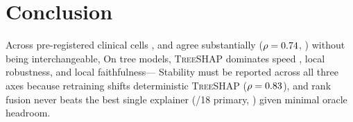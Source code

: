 \section{Conclusion}\label{sec:conclusion}

Across \NumCells{} pre-registered clinical cells ,
\shap{} and \lime{} agree substantially ($\rho=0.74{}$,
) without being interchangeable,  On tree models,
\textsc{TreeSHAP} dominates speed ,
local robustness, and local faithfulness--- Stability must be reported across all three axes because retraining
shifts deterministic \textsc{TreeSHAP} ($\rho=0.83{}$), and rank fusion never beats
the best single explainer (\FusionMaxWins{}/18 primary, )
given minimal oracle headroom.
